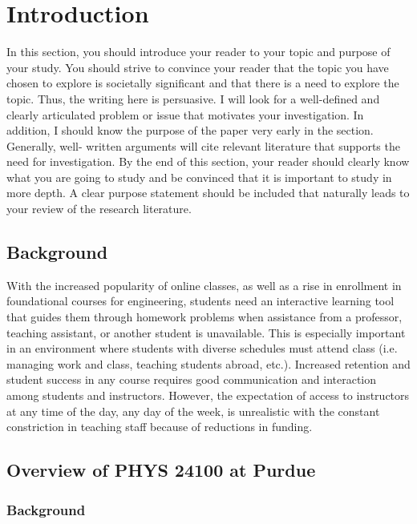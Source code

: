 \chapter[Chapter 1: Introduction]{Introduction}

In this section, you should introduce your reader to your topic and purpose of your study. You should strive to convince your reader that the topic you have chosen to explore is societally significant and that there is a need to explore the topic. Thus, the writing here is persuasive. I will look for a well-defined and clearly articulated problem or issue that motivates your investigation. In addition, I should know the purpose of the paper very early in the section. Generally, well- written arguments will cite relevant literature that supports the need for investigation. By the end of this section, your reader should clearly know what you are going to study and be convinced that it is important to study in more depth. A clear purpose statement should be included that naturally leads to your review of the research literature.

\section{Background}

With the increased popularity of online classes, as well as a rise in enrollment in foundational courses for engineering, students need an interactive learning tool that guides them through homework problems when assistance from a professor, teaching assistant, or another student is unavailable. This is especially important in an environment where students with diverse schedules must attend class (i.e. managing work and class, teaching students abroad, etc.). Increased retention and student success in any course requires good communication and interaction among students and instructors.  However, the expectation of access to instructors at any time of the day, any day of the week, is unrealistic with the constant constriction in teaching staff because of reductions in funding.

\section{Overview of PHYS 24100 at Purdue}

\subsection{Background}

